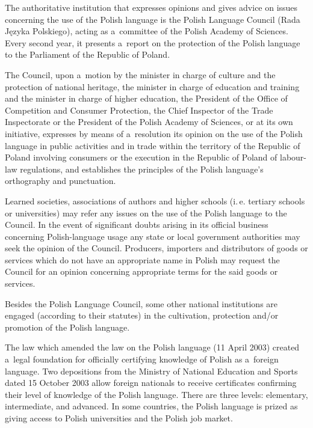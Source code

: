 \begin{multicols}{2}
The authoritative institution that expresses opinions and gives advice
on issues concerning the use of the Polish language is the Polish
Language Council (Rada Języka Polskiego), acting as a~committee of
the Polish Academy of Sciences. Every second year, it presents
a~report on the protection of the Polish language to the Parliament of
the Republic of Poland. 

The Council, upon a~motion by the minister in charge of culture and
the protection of national heritage, the minister in charge of
education and training and the minister in charge of higher education,
the President of the Office of Competition and Consumer Protection,
the Chief Inspector of the Trade Inspectorate or the President of the
Polish Academy of Sciences, or at its own initiative, expresses by
means of a~resolution its opinion on the use of the Polish language in
public activities and in trade within the territory of the Republic of
Poland involving consumers or the execution in the Republic of Poland
of labour-law regulations, and establishes the principles of the
Polish language’s orthography and punctuation. 

Learned societies, associations of authors and higher schools (i.\,e.
tertiary schools or universities) may refer any issues on the use of
the Polish language to the Council. In the event of significant doubts
arising in its official business concerning Polish-language usage any
state or local government authorities may seek the opinion of the
Council. Producers, importers and distributors of goods or services
which do not have an appropriate name in Polish may request the
Council for an opinion concerning appropriate terms for the said goods
or services. 

Besides the Polish Language Council, some other national institutions
are engaged (according to their statutes) in the cultivation,
protection and/or promotion of the Polish language. 

The law which amended the law on the Polish language (11 April 2003)
created a~legal foundation for officially certifying knowledge of
Polish as a~foreign language. Two depositions from the Ministry of
National Education and Sports dated 15 October 2003 allow foreign
nationals to receive certificates confirming their level of knowledge
of the Polish language. There are three levels: elementary,
intermediate, and advanced. In some countries, the Polish language is
prized as giving access to Polish universities and the Polish job
market. 



\end{multicols}
